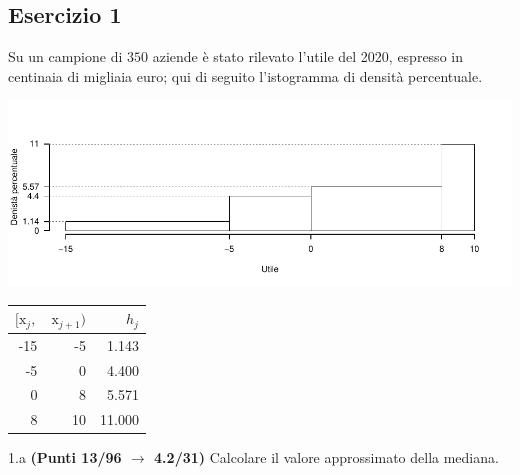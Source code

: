 \documentclass[
  11pt,
]{book}
\theoremstyle{mytheoremstyle}
\theoremstyle{mydefstyle}
\begin{document}
\subsection{Esercizio 1}\label{esercizio-1-3}

Su un campione di \(350\) aziende è stato rilevato l'utile del 2020, espresso in centinaia di migliaia euro;
qui di seguito l'istogramma di densità percentuale.

\begin{center}\includegraphics{Esami_passati_con_soluzioni_files/figure-latex/2021-41-1} \end{center}

\begin{table}[H]
\centering
\begin{tabular}{rrr}
\toprule
$[\text{x}_j,$ & $\text{x}_{j+1})$ & $h_j$\\
\midrule
-15 & -5 & 1.143\\
-5 & 0 & 4.400\\
0 & 8 & 5.571\\
8 & 10 & 11.000\\
\bottomrule
\end{tabular}
\end{table}

1.a \textbf{(Punti 13/96 \(\rightarrow\) 4.2/31)} Calcolare il valore approssimato della mediana.
\end{document}
